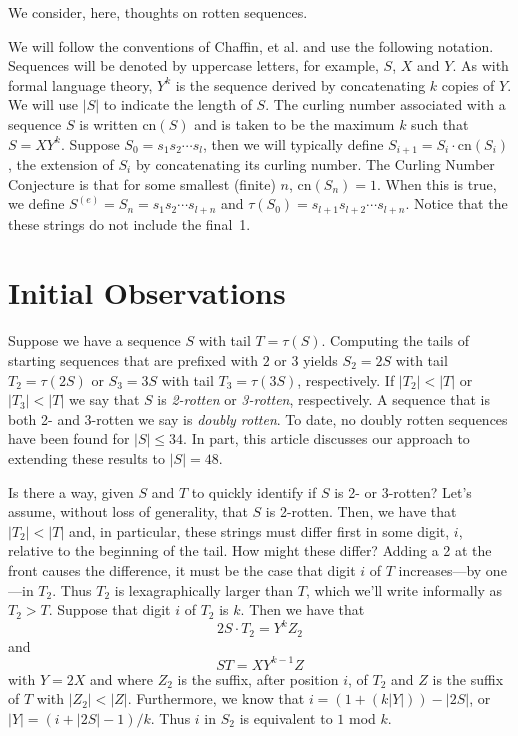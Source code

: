 \documentclass[11pt]{article}
\def\emph#1{{\em #1\/}}
\def\term#1{\emph{#1}}
\def\ni{\noindent}
\def\tail#1{{\tau(#1)}}
\begin{document}
\def\cn#1{\mathrm{cn}(#1)}
\def\tail#1{\tau(#1)}
\def\Sext{S^{(e)}}
We consider, here, thoughts on rotten sequences.

\bigskip

\ni{\bf Notation.}  We will follow the conventions of Chaffin, et al. and use the following notation.  Sequences will be denoted by uppercase letters, for example, $S$, $X$ and $Y$.  As
with formal language theory, $Y^k$ is the sequence derived by concatenating
$k$ copies of $Y$.  We will use $|S|$ to indicate the length of $S$.  The
curling number associated with a sequence $S$ is written $\cn{S}$ and is taken
to be the maximum $k$ such that $S=XY^k$.  Suppose $S_0=s_1s_2\cdots s_l$, then
we will typically define $S_{i+1}=S_{i}\cdot\cn{S_i}$, the extension of $S_i$ by
concatenating its curling number.  The Curling Number Conjecture is that
for some smallest (finite) $n$, $\cn{S_n}=1$.  When this is true, we define
$\Sext=S_n=s_1s_2\cdots s_{l+n}$ and $\tail{S_0}=s_{l+1}s_{l+2}\cdots s_{l+n}$.
Notice that the these strings do not include the final~1.

\section{Initial Observations}
Suppose we have a sequence $S$ with tail $T=\tail{S}$.  Computing the tails of starting
sequences that are prefixed with $2$ or $3$ yields $S_2=2S$ with tail $T_2=\tail{2S}$
or $S_3=3S$ with tail $T_3=\tail{3S}$, respectively.  If $|T_2| < |T|$ or $|T_3|<|T|$
we say that $S$ is \term{2-rotten} or \term{3-rotten}, respectively.  A sequence
that is both 2- and 3-rotten we say is \term{doubly rotten}.  To date, no doubly rotten sequences have been found for $|S|\le 34$.  In part, this article
discusses our approach to extending these results to $|S|=48$.

Is there a way, given $S$ and $T$ to quickly identify if $S$ is 2- or 3-rotten?
Let's assume, without loss of generality, that $S$ is 2-rotten.  Then, we have
that $|T_2|<|T|$ and, in particular, these strings must differ first in some
digit, $i$, relative to the beginning of the tail.  How might these differ? Adding a 2 at the front causes the difference, it must be the case that digit $i$ of $T$ increases---by one---in $T_2$.
Thus $T_2$ is lexagraphically larger than $T$, which we'll write informally as $T_2>T$.
Suppose that digit $i$ of $T_2$ is $k$.  Then we have that
$$2S\cdot T_2=Y^kZ_2$$
\ni and
$$ST=XY^{k-1}Z$$
\ni with $Y=2X$ and where $Z_2$ is the suffix, after position $i$, of $T_2$ and $Z$ is the suffix of $T$ with $|Z_2|<|Z|$. Furthermore, we know that $i=(1+(k|Y|))-|2S|$,
or $|Y|=(i+|2S|-1)/k$.  Thus $i$ in $S_2$ is equivalent to $1$ mod $k$.
\end{document}
